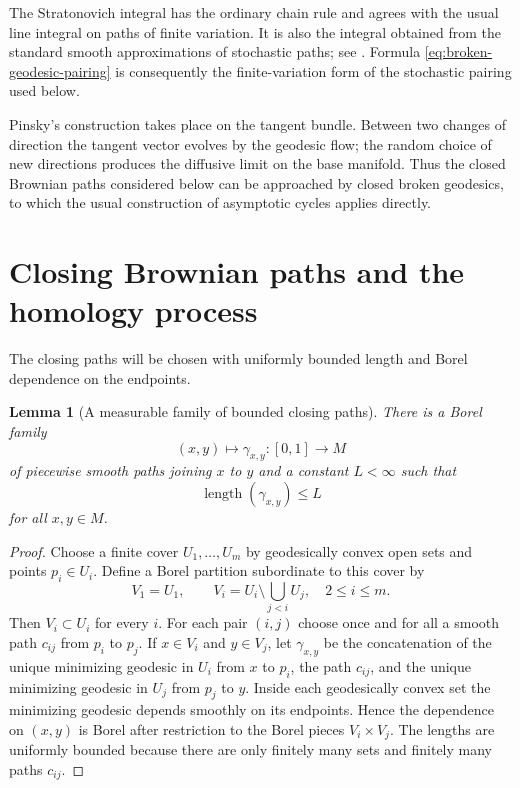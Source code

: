 \documentclass[a4paper,reqno]{amsart}
\newtheorem{lemma}[theorem]{Lemma}
\theoremstyle{definition}
\begin{document}
The Stratonovich integral has the ordinary chain rule and agrees with the usual line integral on paths of finite variation.  It is also the integral obtained from the standard smooth approximations of stochastic paths; see \cite{Emery,Hsu}.  Formula \eqref{eq:broken-geodesic-pairing} is consequently the finite-variation form of the stochastic pairing used below.

Pinsky's construction takes place on the tangent bundle.  Between two changes of direction the tangent vector evolves by the geodesic flow; the random choice of new directions produces the diffusive limit on the base manifold.  Thus the closed Brownian paths considered below can be approached by closed broken geodesics, to which the usual construction of asymptotic cycles applies directly.

\section{Closing Brownian paths and the homology process}

The closing paths will be chosen with uniformly bounded length and Borel dependence on the endpoints.

\begin{lemma}[A measurable family of bounded closing paths]\label{lem:closing}
There is a Borel family
\[
   (x,y)\longmapsto\gamma_{x,y}:[0,1]\to M
\]
of piecewise smooth paths joining $x$ to $y$ and a constant $L<\infty$ such that
\[
   \operatorname{length}(\gamma_{x,y})\le L
\]
for all $x,y\in M$.
\end{lemma}

\begin{proof}
Choose a finite cover $U_1,\ldots,U_m$ by geodesically convex open sets and points $p_i\in U_i$.  Define a Borel partition subordinate to this cover by
\[
V_1=U_1,\qquad
V_i=U_i\setminus\bigcup_{j<i}U_j,\quad 2\le i\le m.
\]
Then $V_i\subset U_i$ for every $i$.  For each pair $(i,j)$ choose once and for all a smooth path $c_{ij}$ from $p_i$ to $p_j$.  If $x\in V_i$ and $y\in V_j$, let $\gamma_{x,y}$ be the concatenation of the unique minimizing geodesic in $U_i$ from $x$ to $p_i$, the path $c_{ij}$, and the unique minimizing geodesic in $U_j$ from $p_j$ to $y$.  Inside each geodesically convex set the minimizing geodesic depends smoothly on its endpoints.  Hence the dependence on $(x,y)$ is Borel after restriction to the Borel pieces $V_i\times V_j$.  The lengths are uniformly bounded because there are only finitely many sets and finitely many paths $c_{ij}$.
\end{proof}
\end{document}
